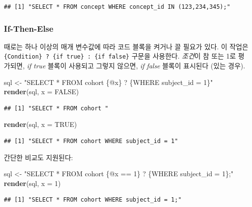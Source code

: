 \documentclass[10.5pt]{book}
\newenvironment{Shaded}{\begin{snugshade}}{\end{snugshade}}
\newcommand{\KeywordTok}[1]{\textcolor[rgb]{0.13,0.29,0.53}{\textbf{#1}}}
\newcommand{\DataTypeTok}[1]{\textcolor[rgb]{0.13,0.29,0.53}{#1}}
\newcommand{\DecValTok}[1]{\textcolor[rgb]{0.00,0.00,0.81}{#1}}
\newcommand{\StringTok}[1]{\textcolor[rgb]{0.31,0.60,0.02}{#1}}
\newcommand{\OtherTok}[1]{\textcolor[rgb]{0.56,0.35,0.01}{#1}}
\newcommand{\NormalTok}[1]{#1}
\theoremstyle{definition}
\theoremstyle{definition}
\theoremstyle{definition}
\theoremstyle{remark}
\begin{document}
\begin{verbatim}
## [1] "SELECT * FROM concept WHERE concept_id IN (123,234,345);"
\end{verbatim}

\subsubsection*{If-Then-Else}\label{if-then-else}

때로는 하나 이상의 매개 변수값에 따라 코드 블록을 켜거나 끌 필요가 있다.
이 작업은 \texttt{\{Condition\}\ ?\ \{if\ true\}\ :\ \{if\ false\}}
구문을 사용한다. \emph{조건}이 참 또는 1로 평가되면, \emph{if true}
블록이 사용되고 그렇지 않으면, \emph{if false} 블록이 표시된다 (있는
경우).

\begin{Shaded}
\begin{Highlighting}[]
\NormalTok{sql <-}\StringTok{ "SELECT * FROM cohort \{@x\} ? \{WHERE subject_id = 1\}"}
\KeywordTok{render}\NormalTok{(sql, }\DataTypeTok{x =} \OtherTok{FALSE}\NormalTok{)}
\end{Highlighting}
\end{Shaded}

\begin{verbatim}
## [1] "SELECT * FROM cohort "
\end{verbatim}

\begin{Shaded}
\begin{Highlighting}[]
\KeywordTok{render}\NormalTok{(sql, }\DataTypeTok{x =} \OtherTok{TRUE}\NormalTok{)}
\end{Highlighting}
\end{Shaded}

\begin{verbatim}
## [1] "SELECT * FROM cohort WHERE subject_id = 1"
\end{verbatim}

간단한 비교도 지원된다:

\begin{Shaded}
\begin{Highlighting}[]
\NormalTok{sql <-}\StringTok{ "SELECT * FROM cohort \{@x == 1\} ? \{WHERE subject_id = 1\};"}
\KeywordTok{render}\NormalTok{(sql, }\DataTypeTok{x =} \DecValTok{1}\NormalTok{)}
\end{Highlighting}
\end{Shaded}

\begin{verbatim}
## [1] "SELECT * FROM cohort WHERE subject_id = 1;"
\end{verbatim}
\end{document}
